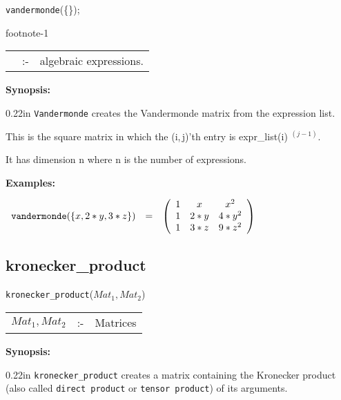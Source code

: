 
\hspace*{0.175in} {\tt vandermonde}(\{\exprlist{}\}); \addtocounter
{footnote}{-1}\footnotemark

\hspace*{0.1in}
\begin{tabular}{l l l}
\exprlist{} &:-& algebraic expressions.
\end{tabular}

{\bf Synopsis:} %

\begin{addtolength}{\leftskip}{0.22in}
{\tt Vandermonde} creates the Vandermonde matrix from
                the expression list.

This is the square matrix in which
                the (i,$\,$j)'th entry is expr\_list(i) $^{(j-1)}$.

It has dimension n where n is the number of expressions.

\end{addtolength}

{\bf Examples:}

\begin{flushleft}
\hspace*{0.1in}
\begin{math}
\begin{array}{ccc}
{\tt vandermonde}(\{x,2*y,3*z\}) & = &
        \left( \begin{array}{ccc} 1 & x & x^2 \\ 1 & 2*y & 4*y^2 \\ 1
& 3*z & 9*z^2
 \end{array} \right)
\end{array}
\end{math}
\end{flushleft}

\subsection{kronecker\_product}

\hspace*{0.175in} {\tt kronecker\_product}($Mat_1,Mat_2$)

\hspace*{0.1in}
\begin{tabular}{l l l}
$Mat_1,Mat_2$ &:-& Matrices
\end{tabular}

{\bf Synopsis:}

\begin{addtolength}{\leftskip}{0.22in}
{\tt kronecker\_product} creates a matrix containing the Kronecker product
(also called {\tt direct product} or {\tt tensor product}) of its arguments.

\end{addtolength}

